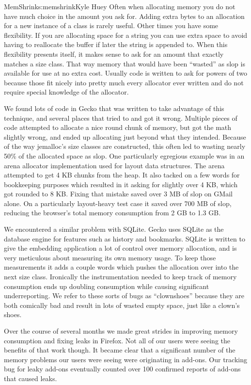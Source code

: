 \begin{aosachapter}{MemShrink}{s:memshrink}{Kyle Huey}
Often when allocating memory you do not have much choice in the amount
you ask for. Adding extra bytes to an allocation for a new instance of a
class is rarely useful. Other times you have some flexibility. If you
are allocating space for a string you can use extra space to avoid
having to reallocate the buffer if later the string is appended to. When
this flexibility presents itself, it makes sense to ask for an amount
that exactly matches a size class. That way memory that would have been
``wasted'' as slop is available for use at no extra cost. Usually code
is written to ask for powers of two because those fit nicely into pretty
much every allocator ever written and do not require special knowledge
of the allocator.

We found lots of code in Gecko that was written to take advantage of
this technique, and several places that tried to and got it wrong.
Multiple pieces of code attempted to allocate a nice round chunk of
memory, but got the math slightly wrong, and ended up allocating just
beyond what they intended. Because of the way jemalloc's size classes
are constructed, this often led to wasting nearly 50\% of the allocated
space as slop. One particularly egregious example was in an arena
allocator implementation used for layout data structures. The arena
attempted to get 4 KB chunks from the heap. It also tacked on a few
words for bookkeeping purposes which resulted in it asking for slightly
over 4 KB, which got rounded to 8 KB. Fixing that mistake saved over 3
MB of slop on GMail alone. On a particularly layout-heavy test case it
saved over 700 MB of slop, reducing the browser's total memory
consumption from 2 GB to 1.3 GB.

We encountered a similar problem with SQLite. Gecko uses SQLite as the
database engine for features such as history and bookmarks. SQLite is
written to give the embedding application a lot of control over memory
allocation, and is very meticulous about measuring its own memory usage.
To keep those measurements it adds a couple words which pushes the
allocation over into the next size class. Ironically the instrumentation
needed to keep track of memory consumption ends up doubling consumption
while causing significant underreporting. We refer to these sorts of
bugs as ``clownshoes'' because they are both comically bad and result in
lots of wasted empty space, just like a clown's shoes.


Over the course of several months we made great strides in improving
memory consumption and fixing leaks in Firefox. Not all of our users
were seeing the benefits of that work though. It became clear that a
significant number of the memory problems our users were seeing were
originating in add-ons. Our tracking bug for leaky add-ons eventually
counted over 100 confirmed reports of add-ons that caused leaks.


\end{aosachapter}
